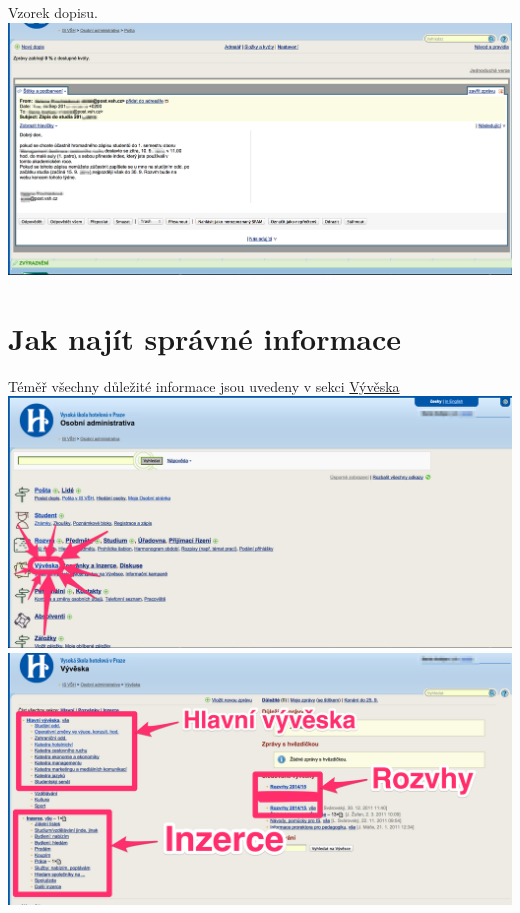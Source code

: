 \documentclass[a4paper,12pt]{article}
\begin{document}
Vzorek dopisu. \\

\includegraphics[width=\textwidth]{s10-1}

\newpage

\section{Jak najít správné informace}

Téměř všechny důležité informace jsou uvedeny v sekci
\href{https://is.vsh.cz/auth/vyveska/}{Vývěska} \\

\includegraphics[width=\textwidth]{s11} \\

\includegraphics[width=\textwidth]{s12-1} \\
\end{document}

